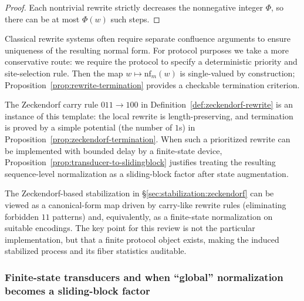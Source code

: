 \begin{proof}
Each nontrivial rewrite strictly decreases the nonnegative integer \(\Phi\), so there can be at most \(\Phi(w)\) such steps.
\end{proof}

\begin{remark}\label{rem:priorities-remove-ambiguity}
Classical rewrite systems often require separate confluence arguments to ensure uniqueness of the resulting normal form.
For protocol purposes we take a more conservative route: we require the protocol to specify a deterministic priority and site-selection rule.
Then the map \(w\mapsto \mathrm{nf}_m(w)\) is single-valued by construction; Proposition~\ref{prop:rewrite-termination} provides a checkable termination criterion.
\end{remark}

\begin{remark}\label{rem:rewrite-template-relation}
The Zeckendorf carry rule \(011\to 100\) in Definition~\ref{def:zeckendorf-rewrite} is an instance of this template: the local rewrite is length-preserving, and termination is proved by a simple potential (the number of \(1\)s) in Proposition~\ref{prop:zeckendorf-termination}.
When such a prioritized rewrite can be implemented with bounded delay by a finite-state device, Proposition~\ref{prop:transducer-to-slidingblock} justifies treating the resulting sequence-level normalization as a sliding-block factor after state augmentation.
\end{remark}

\begin{remark}
The Zeckendorf-based stabilization in \S\ref{sec:stabilization:zeckendorf} can be viewed as a canonical-form map driven by carry-like rewrite rules (eliminating forbidden $11$ patterns) and, equivalently, as a finite-state normalization on suitable encodings. The key point for this review is not the particular implementation, but that a finite protocol object exists, making the induced stabilized process and its fiber statistics auditable.
\end{remark}

\subsubsection{Finite-state transducers and when ``global'' normalization becomes a sliding-block factor}\label{sec:stabilization:fold-transducers}


